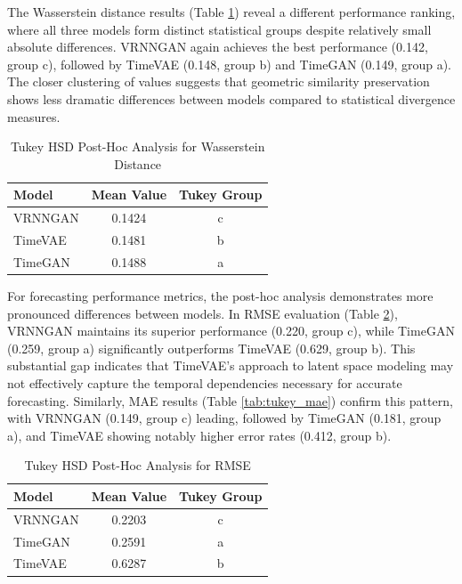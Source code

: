 \documentclass{article}
\begin{document}
The Wasserstein distance results (Table \ref{tab:tukey_wasserstein}) reveal a different performance ranking, where all three models form distinct statistical groups despite relatively small absolute differences. VRNNGAN again achieves the best performance (0.142, group c), followed by TimeVAE (0.148, group b) and TimeGAN (0.149, group a). The closer clustering of values suggests that geometric similarity preservation shows less dramatic differences between models compared to statistical divergence measures.

\begin{table}[H]
\centering
\caption{Tukey HSD Post-Hoc Analysis for Wasserstein Distance}
\label{tab:tukey_wasserstein}
\begin{tabular}{lcc}
\toprule
\textbf{Model} & \textbf{Mean Value} & \textbf{Tukey Group} \\
\midrule
VRNNGAN & 0.1424 & c \\
TimeVAE & 0.1481 & b \\
TimeGAN & 0.1488 & a \\
\bottomrule
\end{tabular}
\footnotesize
\end{table}

For forecasting performance metrics, the post-hoc analysis demonstrates more pronounced differences between models. In RMSE evaluation (Table \ref{tab:tukey_rmse}), VRNNGAN maintains its superior performance (0.220, group c), while TimeGAN (0.259, group a) significantly outperforms TimeVAE (0.629, group b). This substantial gap indicates that TimeVAE's approach to latent space modeling may not effectively capture the temporal dependencies necessary for accurate forecasting. Similarly, MAE results (Table \ref{tab:tukey_mae}) confirm this pattern, with VRNNGAN (0.149, group c) leading, followed by TimeGAN (0.181, group a), and TimeVAE showing notably higher error rates (0.412, group b).


\begin{table}[H]
\centering
\caption{Tukey HSD Post-Hoc Analysis for RMSE}
\label{tab:tukey_rmse}
\begin{tabular}{lcc}
\toprule
\textbf{Model} & \textbf{Mean Value} & \textbf{Tukey Group} \\
\midrule
VRNNGAN & 0.2203 & c \\
TimeGAN & 0.2591 & a \\
TimeVAE & 0.6287 & b \\
\bottomrule
\end{tabular}
\footnotesize
\end{table}
\end{document}
